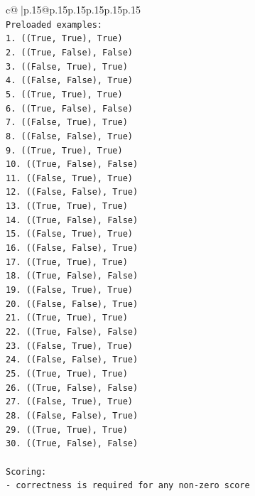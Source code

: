 \documentclass{article}
\begin{document}
{\begin{supertabular}{c@{$\;$}|p{.15\linewidth}@{}p{.15\linewidth}p{.15\linewidth}p{.15\linewidth}p{.15\linewidth}p{.15\linewidth}}
{{{\\ 
\texttt{Preloaded examples:} \\
\texttt{1. ((True, True), True)} \\
\texttt{2. ((True, False), False)} \\
\texttt{3. ((False, True), True)} \\
\texttt{4. ((False, False), True)} \\
\texttt{5. ((True, True), True)} \\
\texttt{6. ((True, False), False)} \\
\texttt{7. ((False, True), True)} \\
\texttt{8. ((False, False), True)} \\
\texttt{9. ((True, True), True)} \\
\texttt{10. ((True, False), False)} \\
\texttt{11. ((False, True), True)} \\
\texttt{12. ((False, False), True)} \\
\texttt{13. ((True, True), True)} \\
\texttt{14. ((True, False), False)} \\
\texttt{15. ((False, True), True)} \\
\texttt{16. ((False, False), True)} \\
\texttt{17. ((True, True), True)} \\
\texttt{18. ((True, False), False)} \\
\texttt{19. ((False, True), True)} \\
\texttt{20. ((False, False), True)} \\
\texttt{21. ((True, True), True)} \\
\texttt{22. ((True, False), False)} \\
\texttt{23. ((False, True), True)} \\
\texttt{24. ((False, False), True)} \\
\texttt{25. ((True, True), True)} \\
\texttt{26. ((True, False), False)} \\
\texttt{27. ((False, True), True)} \\
\texttt{28. ((False, False), True)} \\
\texttt{29. ((True, True), True)} \\
\texttt{30. ((True, False), False)} \\
\\ 
\texttt{Scoring:} \\
\texttt{{-} correctness is required for any non{-}zero score} \\
}}}
\end{supertabular}}
\end{document}
